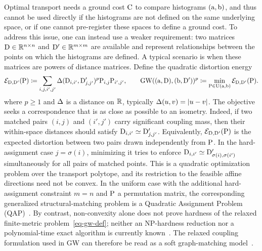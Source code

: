 Optimal transport needs a ground cost $\C$ to compare histograms $(\a,\b)$, and thus cannot be used directly if the histograms are not defined on the same underlying space, or if one cannot pre-register these spaces to define a ground cost.
%
To address this issue, one can instead use a weaker requirement: two matrices $\distD \in \RR^{n \times n}$ and $\distD' \in \RR^{m \times m}$ are available and represent relationships between the points on which the histograms are defined. A typical scenario is when these matrices are powers of distance matrices.
%
Define the quadratic distortion energy
\begin{equation}\label{eq-gw-def}
	\Ee_{\distD,\distD'}(\P)
	\eqdef
	\sum_{i,j,i',j'} \De(\distD_{i,i'},\distD'_{j,j'})^p \P_{i,j}\P_{i',j'},
	\qquad
	\GWD( (\a,\distD), (\b,\distD') )^p
	\eqdef
	\min_{\P \in \CouplingsD(\a,\b) }
	\Ee_{\distD,\distD'}(\P).
\end{equation}
where $p \geq 1$ and $\De$ is a distance on $\RR$, typically $\De(u,v)=|u-v|$.
%
The objective seeks a correspondence that is as close as possible to an isometry. Indeed, if two matched pairs $(i,j)$ and $(i',j')$ carry significant coupling mass, then their within-space distances should satisfy $\distD_{i,i'} \simeq \distD'_{j,j'}$.
Equivalently, $\Ee_{\distD,\distD'}(\P)$ is the expected distortion between two pairs drawn independently from $\P$. In the hard-assignment case $j=\sigma(i)$, minimizing it tries to enforce $\distD_{i,i'}\simeq\distD'_{\sigma(i),\sigma(i')}$ simultaneously for all pairs of matched points.
%
This is a quadratic optimization problem over the transport polytope, and its restriction to the feasible affine directions need not be convex. In the uniform case with the additional hard-assignment constraint $m=n$ and $\P$ a permutation matrix, the corresponding generalized structural-matching problem is a Quadratic Assignment Problem (QAP)~\cite{loiola-2007}. By contrast, non-convexity alone does not prove hardness of the relaxed finite-metric problem~\eqref{eq-gw-def}; neither an NP-hardness reduction nor a polynomial-time exact algorithm is currently known~\cite{Kravtsova2024GWComplexity}.
%
The relaxed coupling formulation used in GW can therefore be read as a soft graph-matching model~\cite{lyzinski-2015}.

